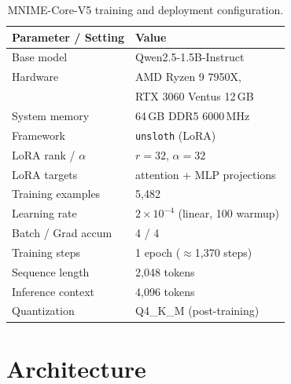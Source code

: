 \documentclass[11pt]{article}
\begin{document}
\begin{table}[h!]
\centering
\small
\begin{tabular}{@{}p{3.1cm}p{4.1cm}@{}}
\toprule
\textbf{Parameter / Setting} & \textbf{Value} \\
\midrule
Base model & Qwen2.5-1.5B-Instruct \\
Hardware & AMD Ryzen 9 7950X, \\
         & RTX 3060 Ventus 12\,GB \\
System memory & 64\,GB DDR5 6000\,MHz \\
Framework & \texttt{unsloth} (LoRA) \\
LoRA rank / $\alpha$ & $r=32$, $\alpha=32$ \\
LoRA targets & attention + MLP projections \\
Training examples & 5,482 \\
Learning rate & $2 \times 10^{-4}$ (linear, 100 warmup) \\
Batch / Grad accum & 4 / 4 \\
Training steps & 1 epoch ($\approx$1,370 steps) \\
Sequence length & 2,048 tokens \\
Inference context & 4,096 tokens \\
Quantization & Q4\_K\_M (post-training) \\
\bottomrule
\end{tabular}
\caption{MNIME-Core-V5 training and deployment configuration.}
\label{tab:training}
\end{table}

\section{Architecture}
\label{sec:arch_diagram}
\end{document}

